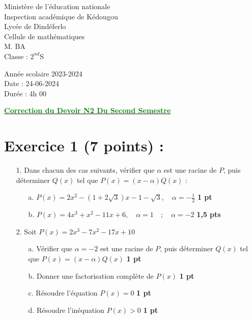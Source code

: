 \documentclass[12pt]{article}
\begin{document}
\begin{minipage}{0.5\textwidth}
	Ministère de l'éducation nationale  \\
	Inspection académique de Kédougou   \\
	Lycée de Dindéferlo            \\
	Cellule de mathématiques            \\
	M. BA                          \\
	Classe : $2^{nd}$S  \\
\end{minipage}
\begin{minipage}{0.5\textwidth}
	Année scolaire 2023-2024 \\
	Date : 24-06-2024 \\
	Durée : 4h 00 \\
\end{minipage}

\begin{center}
	\textbf{{\underline{\textcolor{green}{Correction du Devoir N2 Du Second Semestre}}}}
\end{center}

\section*{Exercice 1 (7 points) :}
\begin{itemize}
\item[1.] Dans chacun des cas suivants, vérifier que $\alpha$ est une racine de $P$, puis déterminer $Q(x)$ tel que $P(x)=(x-\alpha)Q(x)$ :
\begin{itemize}
\item[a.] $P(x)=2x^{2}-(1+2\sqrt{3})x-1-\sqrt{3},\quad \alpha=-\frac{1}{2}$ \textbf{1 pt}

\item[b.] $P(x)=4x^{3}+x^{2}-11x+6,\quad \alpha=1\quad;\quad \alpha=-2$ \textbf{1,5 pts}
\end{itemize}
\item[2.] Soit $P(x)=2x^{3}-7x^{2}-17x+10$
\begin{itemize}
\item[a.] Vérifier que $\alpha=-2$ est une racine de $P$, puis déterminer $Q(x)$ tel que $P(x)=(x-\alpha)Q(x)$ \textbf{1 pt}

\item[b.] Donner une factorisation complète de $P(x)$ \textbf{1 pt}
\item[c.] Résoudre l'équation $P(x)=0$ \textbf{1 pt}
\item[d.] Résoudre l'inéquation $P(x)>0$ \textbf{1 pt}
\end{itemize}
\end{itemize}
\end{document}
